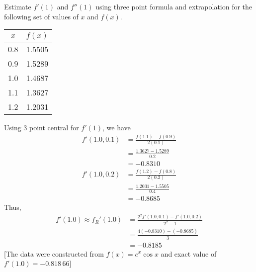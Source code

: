\documentclass[12pt,class=book,crop=false]{standalone}
\begin{document}
\begin{ex}
    Estimate $ f' (1) $ and $ f''(1 ) $ using three point formula and extrapolation for the following set of values of  $ x $ and $ f(x). $
    \begin{table}[H]
        \centering
        \begin{tabular}{cS[table-format=2.4]}
            \toprule
            $ x $ &  \\   & 1.5505   \\
            0.9   & 1.5289   \\
            1.0   & 1.4687   \\
            1.1   & 1.3627   \\
            1.2   & 1.2031   \\\bottomrule
        \end{tabular}
    \end{table}

    Using 3 point central for $ f' (1) $, we have
    \begin{align*}
        f' (1.0,0.1) & =\frac{f(1.1)-f(0.9)}{2(0.1)} \\
                     & =\frac{1.3627-1.5289}{0.2}    \\
                     & =-0.8310                      \\
        f' (1.0,0.2) & =\frac{f(1.2)-f(0.8)}{2(0.2)} \\
                     & =\frac{1.2031-1.5505}{0.4}    \\
                     & =-0.8685
    \end{align*}
    Thus,
    \begin{align*}
        f' (1.0)\approx f_R' (1.0) & =\frac{2^2 f' (1.0,0.1)-f' (1.0,0.2)}{2^2-1} \\
                                   & =\frac{4(-0.8310)-(-0.8685)}{3}              \\
                                   & =-0.8185
    \end{align*}
    [The data were constructed from $ f(x)=e^x  \cos x $ and exact value of $ f' (1.0)=-0.818\,66 $]\\


\end{ex}
\end{document}
